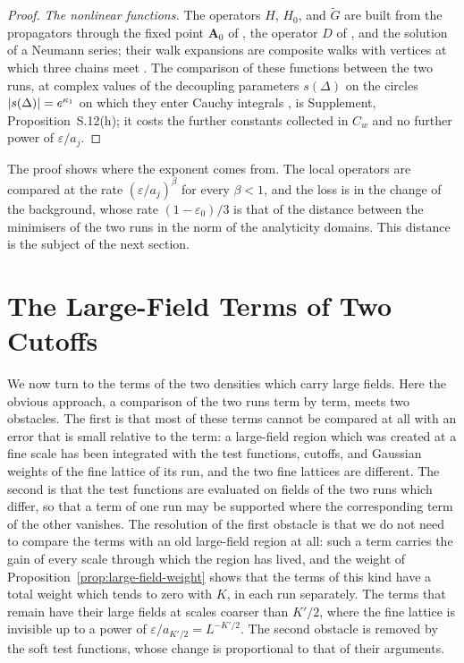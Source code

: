 \documentclass[11pt]{preprint}
\DeclarePairedDelimiter{\abs}{\lvert}{\rvert}
\numberwithin{equation}{section}
\theoremstyle{definition}
\theoremstyle{remark}
\theoremstyle{plain}
\begin{document}
\begin{proof}
\emph{The nonlinear functions.} The operators $H$, $H_0$, and $\tilde G$ are built from the propagators through the fixed point $\mathbf A_0$ of \cite[(1.4), p.~2]{BalabanRG2}, the operator $D$ of \cite[(1.3)]{BalabanRG2}, and the solution of a Neumann series; their walk expansions are composite walks with vertices at which three chains meet \cite[p.~427]{BalabanPBG}. The comparison of these functions between the two runs, at complex values of the decoupling parameters $s(\Delta)$ on the circles $\abs{s(\Delta)} = e^{\kappa_1}$ on which they enter Cauchy integrals \cite[(1.23), p.~7]{BalabanRG2}, is Supplement, Proposition~S.12(h); it costs the further constants collected in $C_w$ and no further power of $\varepsilon/a_j$.
\end{proof}

The proof shows where the exponent comes from. The local operators are compared at the rate $(\varepsilon/a_j)^\beta$ for every $\beta < 1$, and the loss is in the change of the background, whose rate $(1 - \varepsilon_0)/3$ is that of the distance between the minimisers of the two runs in the norm of the analyticity domains. This distance is the subject of the next section.

\section{The Large-Field Terms of Two Cutoffs}\label{sec:large-field-comparison}

We now turn to the terms of the two densities which carry large fields. Here the obvious approach, a comparison of the two runs term by term, meets two obstacles. The first is that most of these terms cannot be compared at all with an error that is small relative to the term: a large-field region which was created at a fine scale has been integrated with the test functions, cutoffs, and Gaussian weights of the fine lattice of its run, and the two fine lattices are different. The second is that the test functions are evaluated on fields of the two runs which differ, so that a term of one run may be supported where the corresponding term of the other vanishes. The resolution of the first obstacle is that we do not need to compare the terms with an old large-field region at all: such a term carries the gain of every scale through which the region has lived, and the weight of Proposition~\ref{prop:large-field-weight} shows that the terms of this kind have a total weight which tends to zero with $K$, in each run separately. The terms that remain have their large fields at scales coarser than $K'/2$, where the fine lattice is invisible up to a power of $\varepsilon/a_{K'/2} = L^{-K'/2}$. The second obstacle is removed by the soft test functions, whose change is proportional to that of their arguments.
\end{document}
